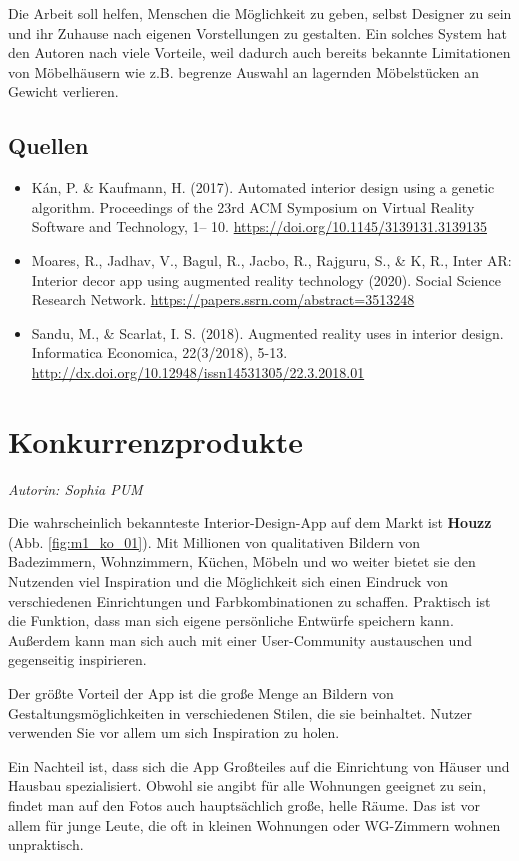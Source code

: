 \documentclass[12pt,paper=a4,oneside,hidelinks,headings=small,captions=heading,captions=nooneline]{scrartcl}
\begin{document}
Die Arbeit soll helfen, Menschen die Möglichkeit zu geben, selbst
Designer zu sein und ihr Zuhause nach eigenen Vorstellungen zu
gestalten. Ein solches System hat den Autoren nach viele Vorteile,
weil dadurch auch bereits bekannte Limitationen von Möbelhäusern wie
z.B. begrenze Auswahl an lagernden Möbelstücken an Gewicht
verlieren.

\subsection{Quellen}
\label{sec:org1b0bd12}
\begin{itemize}
\item Kán, P. \& Kaufmann, H. (2017). Automated interior design using a
genetic algorithm. Proceedings of the 23rd ACM Symposium on Virtual
Reality Software and Technology,
1– 10. \url{https://doi.org/10.1145/3139131.3139135}
\item Moares, R., Jadhav, V., Bagul, R., Jacbo, R., Rajguru, S., \& K, R.,
Inter AR: Interior decor app using augmented reality technology
(2020). Social Science Research
Network. \url{https://papers.ssrn.com/abstract=3513248}
\item Sandu, M., \& Scarlat, I. S. (2018). Augmented reality uses in interior
design. Informatica Economica, 22(3/2018), 5-13. 
\url{http://dx.doi.org/10.12948/issn14531305/22.3.2018.01}
\end{itemize}
\section{Konkurrenzprodukte}
\label{sec:orgeb112b2}
\emph{Autorin: Sophia PUM}

Die wahrscheinlich bekannteste Interior-Design-App auf dem Markt ist
\textbf{Houzz} (Abb. \ref{fig:m1_ko_01}). Mit Millionen von qualitativen Bildern von Badezimmern,
Wohnzimmern, Küchen, Möbeln und wo weiter bietet sie den Nutzenden
viel Inspiration und die Möglichkeit sich einen Eindruck von
verschiedenen Einrichtungen und Farbkombinationen zu
schaffen. Praktisch ist die Funktion, dass man sich eigene persönliche
Entwürfe speichern kann. Außerdem kann man sich auch mit einer
User-Community austauschen und gegenseitig inspirieren.

Der größte Vorteil der App ist die große Menge an Bildern von
Gestaltungsmöglichkeiten in verschiedenen Stilen, die sie
beinhaltet. Nutzer verwenden Sie vor allem um sich Inspiration zu
holen.

Ein Nachteil ist, dass sich die App Großteiles auf die Einrichtung von
Häuser und Hausbau spezialisiert. Obwohl sie angibt für alle Wohnungen
geeignet zu sein, findet man auf den Fotos auch hauptsächlich große,
helle Räume. Das ist vor allem für junge Leute, die oft in kleinen
Wohnungen oder WG-Zimmern wohnen unpraktisch.
\end{document}
